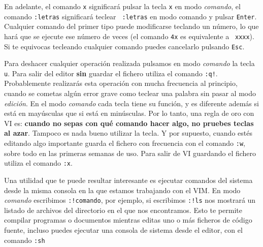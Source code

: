 
En adelante, el comando {\tt x} significará pulsar la tecla {\tt x} en
modo {\em comando}, el comando  {\tt :letras} significará teclear {\tt
:letras} en modo  comando y pulsar {\tt Enter}.  Cualquier comando del
primer tipo puede  modificarse teclando un número, lo que  hará que se
ejecute ese número de veces (el comando {\tt 4x} es equivalente a {\tt
xxxx}). Si te equivocas  tecleando cualquier comando puedes cancelarlo
pulsando {\tt Esc}.

Para  deshacer cualquier  operación  realizada pulsamos  en modo  {\em
comando} la tecla {\tt u}. Para  salir del editor {\bf sin} guardar el
fichero utiliza  el comando  {\tt :q!}. Probablemente  realizarás esta
operación con mucha  frecuencia al principio, cuando  se cometas algún
error grave como teclear una palabra  sin pasar al modo {\em edición}.
En el modo  {\em comando} cada tecla tiene su  función, y es diferente
además si está en mayúsculas que  si está en minúsculas. Por lo tanto,
una regla de oro con {\sf VI} es: {\bf cuando no sepas con qué comando
hacer algo, no pruebes teclas al azar}. Tampoco es nada bueno utilizar
la tecla. Y por supuesto, cuando estés editando algo importante guarda
el fichero con  frecuencia con el comando {\tt :w},  sobre todo en las
primeras semanas de  uso. Para salir de {\sf VI}  guardando el fichero
utiliza el comando {\tt :x}.

Una utilidad  que te puede  resultar interesante es  ejecutar comandos
del sistema desde la misma consola en la que estamos trabajando con el
{\sf  VIM}. En  modo  {\em comando}  escribimos  {\tt :!comando},  por
ejemplo, si escribimos {\tt :!ls}  nos mostrará un listado de archivos
del directorio  en el  que nos encontramos.  Esto te  permite compilar
programas o  documentos mientras editas  uno o más ficheros  de código
fuente,  incluso  puedes ejecutar  una  consola  de sistema  desde  el
editor, con el comando {\tt :sh}

